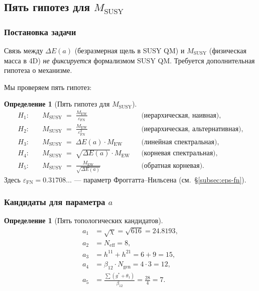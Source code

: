 \documentclass[11pt,a4paper]{article}
\theoremstyle{definition}
\newtheorem{definition}[theorem]{Определение}
\begin{document}
\subsection{Пять гипотез для \texorpdfstring{$M_{\text{SUSY}}$}{M\_SUSY}}
\label{subsec:susy-hypotheses}

\subsubsection{Постановка задачи}

Связь между $\Delta E(a)$ (безразмерная щель в SUSY QM)
и $M_{\text{SUSY}}$ (физическая масса в 4D) \emph{не фиксируется}
формализмом SUSY QM. Требуется дополнительная гипотеза
о механизме.

\medskip\noindent
Мы проверяем пять гипотез:

\begin{definition}[Пять гипотез для $M_{\text{SUSY}}$]
\label{def:five-hypotheses}
\begin{align}
    H_1:&\quad M_{\text{SUSY}} \;=\; \frac{M_{\text{EW}}}{\varepsilon_{\text{FN}}}
    && \text{(иерархическая, наивная)}, \label{eq:H1-hyp} \\[0.3em]
    H_2:&\quad M_{\text{SUSY}} \;=\; \frac{M_{\text{EW}}}{\varepsilon_{\text{FN}}^2}
    && \text{(иерархическая, альтернативная)}, \label{eq:H2-hyp} \\[0.3em]
    H_3:&\quad M_{\text{SUSY}} \;=\; \Delta E(a) \cdot M_{\text{EW}}
    && \text{(линейная спектральная)}, \label{eq:H3} \\[0.3em]
    H_4:&\quad M_{\text{SUSY}} \;=\; \sqrt{\Delta E(a)} \cdot M_{\text{EW}}
    && \text{(корневая спектральная)}, \label{eq:H4} \\[0.3em]
    H_5:&\quad M_{\text{SUSY}} \;=\; \frac{M_{\text{EW}}}{\sqrt{\Delta E(a)}}
    && \text{(обратная корневая)}. \label{eq:H5}
\end{align}
Здесь $\varepsilon_{\text{FN}} = 0.31708\ldots$ --- параметр
Фроггатта--Нильсена (см.~\S\ref{subsec:eps-fn}).
\end{definition}

\subsubsection{Кандидаты для параметра \texorpdfstring{$a$}{a}}

\begin{definition}[Пять топологических кандидатов]
\label{def:five-a}
\begin{align}
    a_1 &= \sqrt{\chi} = \sqrt{616} = 24.8193, \\
    a_2 &= N_{\text{eff}} = 8, \\
    a_3 &= h^{11} + h^{21} = 6 + 9 = 15, \\
    a_4 &= \beta_{12} \cdot N_{\text{gen}} = 4 \cdot 3 = 12, \\
    a_5 &= \frac{\sum(g^* + \theta_1)}{\beta_{12}} = \frac{28}{4} = 7.
\end{align}
\end{definition}
\end{document}
